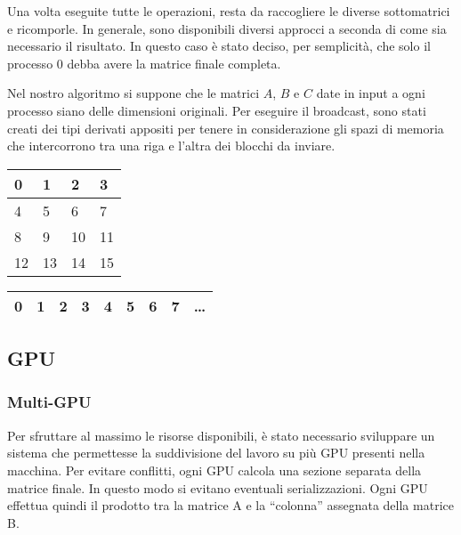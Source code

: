 \documentclass[a4paper]{article}
\begin{document}
Una volta eseguite tutte le operazioni, resta da raccogliere le diverse sottomatrici e ricomporle. In generale, sono disponibili diversi approcci a seconda di come sia necessario il risultato. In questo caso è stato deciso, per semplicità, che solo il processo 0 debba avere la matrice finale completa.

\medskip Nel nostro algoritmo si suppone che le matrici $A$, $B$ e $C$ date in input a ogni processo siano delle dimensioni originali. Per eseguire il broadcast, sono stati creati dei tipi derivati appositi per tenere in considerazione gli spazi di memoria che intercorrono tra una riga e l'altra dei blocchi da inviare.
\begin{table}[h]
    \begin{tabular}{|l|l|l|l|}
        \hline
        \cellcolor{yellow}0 & \cellcolor{yellow}1 & 2  & 3  \\ \hline
        \cellcolor{yellow}4 & \cellcolor{yellow}5 & 6  & 7  \\ \hline
        8                   & 9                   & 10 & 11 \\ \hline
        12                  & 13                  & 14 & 15 \\ \hline
    \end{tabular}
    \begin{tabular}{|l|l|l|l|l|l|l|l|l}
        \hline
        \cellcolor{yellow}0 & \cellcolor{yellow}1 & 2 & 3 & \cellcolor{yellow}4 & \cellcolor{yellow}5 & 6 & 7 & \dots \\ \hline
    \end{tabular}
\end{table}

\subsection{GPU}
\subsubsection{Multi-GPU}
Per sfruttare al massimo le risorse disponibili, è stato necessario sviluppare un sistema che permettesse la suddivisione del lavoro su più GPU presenti nella macchina.
Per evitare conflitti, ogni GPU calcola una sezione separata della matrice finale. In questo modo si evitano eventuali serializzazioni.
Ogni GPU effettua quindi il prodotto tra la matrice A e la ``colonna'' assegnata della matrice B.
\end{document}
